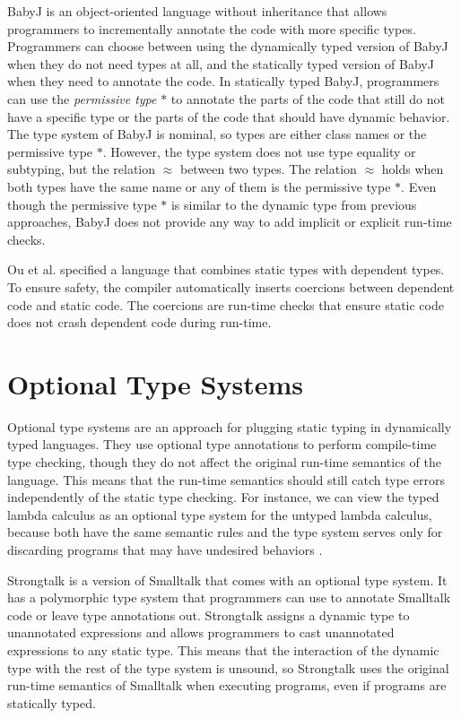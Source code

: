BabyJ \cite{anderson2003babyj} is an object-oriented language
without inheritance that allows programmers to incrementally annotate
the code with more specific types.
Programmers can choose between using the dynamically typed version
of BabyJ when they do not need types at all, and the statically
typed version of BabyJ when they need to annotate the code.
In statically typed BabyJ, programmers can use the
\emph{permissive type} $*$ to annotate the parts of the code that
still do not have a specific type or the parts of the code that should
have dynamic behavior.
The type system of BabyJ is nominal, so types are either class names
or the permissive type $*$.
However, the type system does not use type equality or subtyping,
but the relation $\approx$ between two types.
The relation $\approx$ holds when both types have the same name or
any of them is the permissive type $*$.
Even though the permissive type $*$ is similar to the dynamic type
from previous approaches, BabyJ does not provide any way to add
implicit or explicit run-time checks.

Ou et al. \cite{ou2004dtd} specified a language that combines
static types with dependent types.
To ensure safety, the compiler automatically inserts coercions
between dependent code and static code.
The coercions are run-time checks that ensure static code does not
crash dependent code during run-time.

\section{Optional Type Systems}
\label{sec:optional}

Optional type systems \cite{bracha2004pluggable} are an approach for
plugging static typing in dynamically typed languages.
They use optional type annotations to perform compile-time type checking,
though they do not affect the original run-time semantics
of the language.
This means that the run-time semantics should still catch type errors
independently of the static type checking.
For instance, we can view the typed lambda calculus as an optional
type system for the untyped lambda calculus, because both have the
same semantic rules and the type system serves only for discarding
programs that may have undesired behaviors \cite{bracha2004pluggable}.

Strongtalk \cite{bracha1993strongtalk,bracha1996strongtalk} is
a version of Smalltalk that comes with an optional type system.
It has a polymorphic type system that programmers can use to annotate
Smalltalk code or leave type annotations out.
Strongtalk assigns a dynamic type to unannotated expressions and allows
programmers to cast unannotated expressions to any static type.
This means that the interaction of the dynamic type with the rest of
the type system is unsound, so Strongtalk uses the original run-time
semantics of Smalltalk when executing programs, even if programs are
statically typed.

